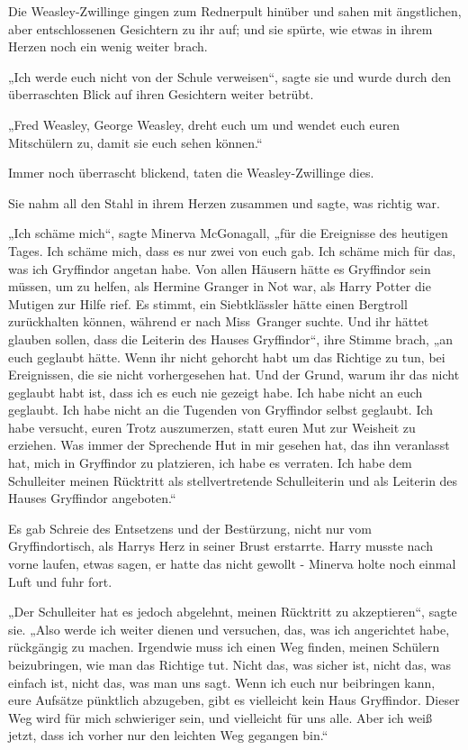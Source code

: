 {Die Weasley-Zwillinge gingen zum Rednerpult hinüber und sahen mit ängstlichen, aber entschlossenen Gesichtern zu ihr auf; und sie spürte, wie etwas in ihrem Herzen noch ein wenig weiter brach.

„Ich werde euch nicht von der Schule verweisen“, sagte sie und wurde durch den überraschten Blick auf ihren Gesichtern weiter betrübt.

„Fred Weasley, George Weasley, dreht euch um und wendet euch euren Mitschülern zu, damit sie euch sehen können.“

Immer noch überrascht blickend, taten die Weasley-Zwillinge dies.

Sie nahm all den Stahl in ihrem Herzen zusammen und sagte, was richtig war.

„Ich schäme mich“, sagte Minerva McGonagall, „für die Ereignisse des heutigen Tages. Ich schäme mich, dass es nur zwei von euch gab. Ich schäme mich für das, was ich Gryffindor angetan habe. Von allen Häusern hätte es Gryffindor sein müssen, um zu helfen, als Hermine Granger in Not war, als Harry Potter die Mutigen zur Hilfe rief. Es stimmt, ein Siebtklässler hätte einen Bergtroll zurückhalten können, während er nach Miss~Granger suchte. Und ihr hättet glauben sollen, dass die Leiterin des Hauses Gryffindor“, ihre Stimme brach, „an euch geglaubt hätte. Wenn ihr nicht gehorcht habt um das Richtige zu tun, bei Ereignissen, die sie nicht vorhergesehen hat. Und der Grund, warum ihr das nicht geglaubt habt ist, dass ich es euch nie gezeigt habe. Ich habe nicht an euch geglaubt. Ich habe nicht an die Tugenden von Gryffindor selbst geglaubt. Ich habe versucht, euren Trotz auszumerzen, statt euren Mut zur Weisheit zu erziehen. Was immer der Sprechende Hut in mir gesehen hat, das ihn veranlasst hat, mich in Gryffindor zu platzieren, ich habe es verraten. Ich habe dem Schulleiter meinen Rücktritt als stellvertretende Schulleiterin und als Leiterin des Hauses Gryffindor angeboten.“

Es gab Schreie des Entsetzens und der Bestürzung, nicht nur vom Gryffindortisch, als Harrys Herz in seiner Brust erstarrte. Harry musste nach vorne laufen, etwas sagen, er hatte das nicht gewollt - Minerva holte noch einmal Luft und fuhr fort.

„Der Schulleiter hat es jedoch abgelehnt, meinen Rücktritt zu akzeptieren“, sagte sie. „Also werde ich weiter dienen und versuchen, das, was ich angerichtet habe, rückgängig zu machen. Irgendwie muss ich einen Weg finden, meinen Schülern beizubringen, wie man das Richtige tut. Nicht das, was sicher ist, nicht das, was einfach ist, nicht das, was man uns sagt. Wenn ich euch nur beibringen kann, eure Aufsätze pünktlich abzugeben, gibt es vielleicht kein Haus Gryffindor. Dieser Weg wird für mich schwieriger sein, und vielleicht für uns alle. Aber ich weiß jetzt, dass ich vorher nur den leichten Weg gegangen bin.“

}
